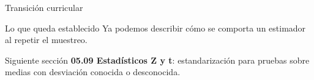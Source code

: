\documentclass[10pt,aspectratio=169]{beamer}
\begin{document}
\begin{frame}{Transición curricular}
  \footnotesize
  \begin{block}{Lo que queda establecido}
    Ya podemos describir cómo se comporta un estimador al repetir el muestreo.
  \end{block}
  \begin{alertblock}{Siguiente sección}
    \textbf{05.09 Estadísticos Z y t}: estandarización para pruebas sobre medias
    con desviación conocida o desconocida.
  \end{alertblock}
\end{frame}
\end{document}
